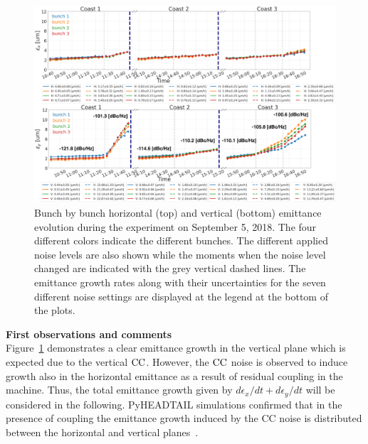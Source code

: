 \begin{figure}
   \centering
   \includegraphics[width=1.0\textwidth]{images/Ch5/MD5_overview_x_y.png}
   \caption{Bunch by bunch horizontal (top) and vertical (bottom) emittance evolution during the experiment on September 5, 2018. The four different colors indicate the different bunches. The different applied noise levels are also shown while the moments when the noise level changed are indicated with the grey vertical dashed lines. The emittance growth rates along with their uncertainties for the seven different noise settings are displayed at the legend at the bottom of the plots.}
   \label{fig:MD5_overview_x_y}
\end{figure}
   
\textbf{First observations and comments}\\
Figure~\ref{fig:MD5_overview_x_y} demonstrates a clear emittance growth in the vertical plane which is expected due to the vertical ${\mathrm{CC}}$. However, the ${\mathrm{CC}}$ noise is observed to induce growth also in the horizontal emittance as a result of residual coupling in the machine. Thus, the total emittance growth given by $d\epsilon_x/dt + d\epsilon_y/dt$ will be considered in the following. PyHEADTAIL simulations confirmed that in the presence of coupling the emittance growth induced by the CC noise is distributed between the horizontal and vertical planes~\cite{Baudrenghien_HL-LHC19v6}.

